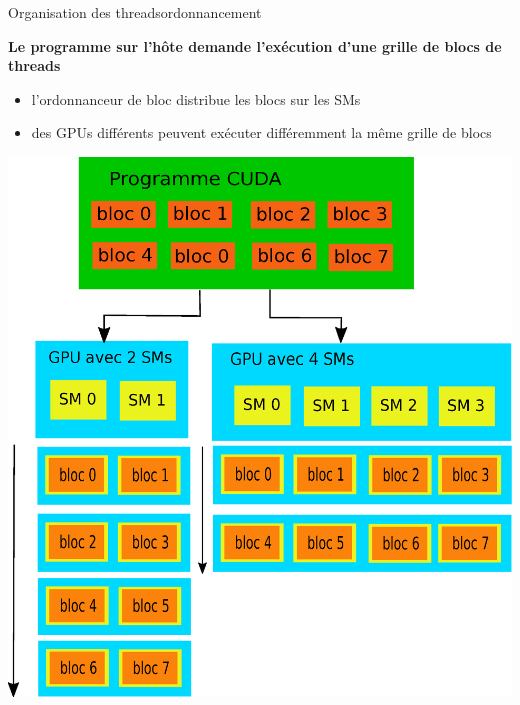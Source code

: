 \documentclass[11pt,mathserif]{beamer}
\newcommand{\kontuz}{\faExclamationTriangle}
\begin{document}
\begin{frame}{Organisation des threads}{ordonnancement}
 \pause
 \begin{minipage}[c]{0.59\linewidth}
   {\bf Le programme sur l'hôte demande l'exécution d'une grille de blocs de threads}
  \begin{itemize}[<+->]
    \item l'ordonnanceur de bloc distribue les blocs sur les SMs
    \item[\kontuz] des GPUs différents peuvent exécuter différemment la même grille de blocs
  \end{itemize}
\end{minipage}
\begin{minipage}[c]{0.39\linewidth}
\begin{center}
  \includegraphics[width=0.95\linewidth]{fig/bloc_ordonanceur.eps}
\end{center}
\end{minipage}
\end{frame}
\end{document}
